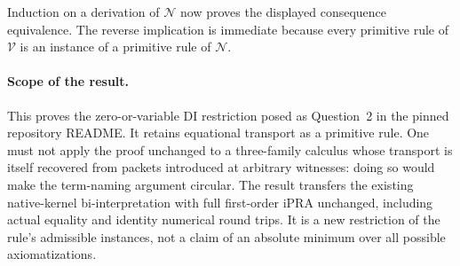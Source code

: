 Induction on a derivation of $\mathcal N$ now proves the displayed
consequence equivalence. The reverse implication is immediate because
every primitive rule of $\mathcal V$ is an instance of a primitive rule
of $\mathcal N$.

\paragraph{Scope of the result.}
This proves the zero-or-variable DI restriction posed as Question~2 in the
pinned repository README. It retains equational transport as a primitive
rule. One must not apply the proof unchanged to a three-family calculus
whose transport is itself recovered from packets introduced at arbitrary
witnesses: doing so would make the term-naming argument circular.
The result transfers the existing native-kernel bi-interpretation with full
first-order iPRA unchanged, including actual equality and identity numerical
round trips. It is a new restriction of the rule's admissible instances,
not a claim of an absolute minimum over all possible axiomatizations.
